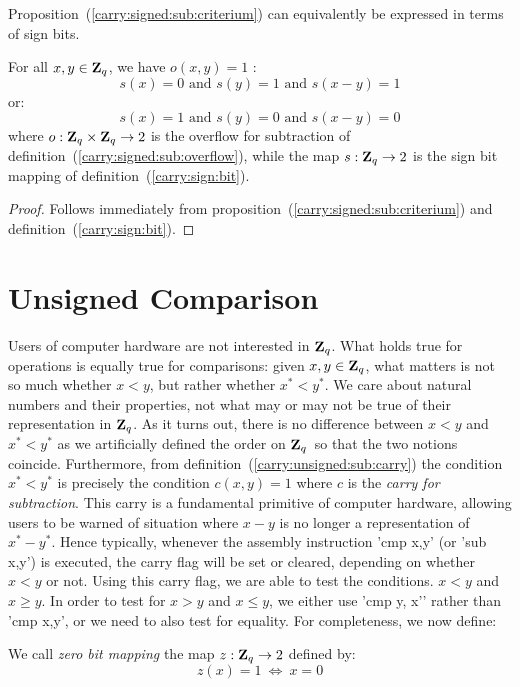 \documentclass{article}
\newcommand{\zq}{\mbox{${\bf Z}_{q}$}}
\begin{document}
Proposition~(\ref{carry:signed:sub:criterium}) can equivalently be expressed
in terms of sign bits.
\begin{prop}\label{carry:signed:sub:criterium:2}
  For all $x,y\in\zq$, we have $o(x,y)=1$ \ifand:
  \[
    s(x)=0\mbox{\ and\ }s(y)=1\mbox{\ and\ }s(x-y)=1
  \]
or:
  \[
    s(x)=1\mbox{\ and\ }s(y)=0\mbox{\ and\ }s(x-y)=0
  \]
where $o:\zq\times\zq\rightarrow 2$ is the overflow for subtraction of 
  definition~(\ref{carry:signed:sub:overflow}), while the map $s:\zq\rightarrow 2$
  is the sign bit mapping of definition~(\ref{carry:sign:bit}).
\end{prop}
\begin{proof}
  Follows immediately from proposition~(\ref{carry:signed:sub:criterium})
  and definition~(\ref{carry:sign:bit}).
\end{proof}

\section{Unsigned Comparison}
Users of computer hardware are not interested in \zq. What holds true
for operations is equally true for comparisons: given $x,y\in\zq$, what
matters is not so much whether $x<y$, but rather whether $x^{*}<y^{*}$.
We care about natural numbers and their properties, not what may or
may not be true of their representation in \zq. As it turns out, there
is no difference between $x<y$ and $x^{*}<y^{*}$ as we artificially
defined the order on \zq\ so that the two notions coincide. Furthermore,
from definition~(\ref{carry:unsigned:sub:carry}) the condition 
$x^{*}<y^{*}$ is precisely the condition $c(x,y)=1$ where $c$ is 
the {\em carry for subtraction}. This carry is a fundamental primitive
of computer hardware, allowing users to be warned of situation where
$x-y$ is no longer a representation of $x^{*}-y^{*}$. Hence typically,
whenever the assembly instruction '{\rm cmp x,y}' (or '{\rm sub x,y}')
is executed, the carry flag will be set or cleared, depending on whether
$x<y$ or not. Using this carry flag, we are able to test the conditions.
$x<y$ and $x\geq y$. In order to test for $x>y$ and $x\leq y$, we
either use '{\rm cmp y, x'}' rather than '{\rm cmp x,y}', or we need
to also test for equality. For completeness, we now define:

\begin{defin}\label{carry:zero:bit}
  We call {\em zero bit mapping} the map $z:\zq\rightarrow 2$ defined by:
    \[
      z(x) = 1\ \Leftrightarrow\ x=0
    \]
\end{defin}
\end{document}
